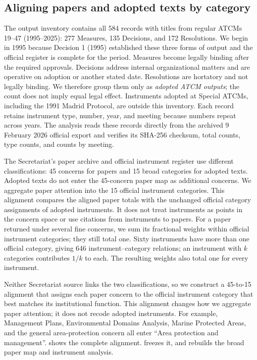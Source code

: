 \documentclass{fun_article}
\begin{document}
\subsection{Aligning papers and adopted texts by category}\label{sec:outcome-positioning}
The output inventory contains all 584 records with titles from regular ATCMs 19--47 (1995--2025): 277 Measures, 135 Decisions, and 172 Resolutions. We begin in 1995 because Decision 1 (1995) established these three forms of output and the official register is complete for the period. Measures become legally binding after the required approvals. Decisions address internal organizational matters and are operative on adoption or another stated date. Resolutions are hortatory and not legally binding. We therefore group them only as \emph{adopted ATCM outputs}; the count does not imply equal legal effect. Instruments adopted at Special ATCMs, including the 1991 Madrid Protocol, are outside this inventory. Each record retains instrument type, number, year, and meeting because numbers repeat across years. The analysis reads these records directly from the archived 9 February 2026 official export and verifies its SHA-256 checksum, total counts, type counts, and counts by meeting.

The Secretariat's paper archive and official instrument register use different classifications: 45 concerns for papers and 15 broad categories for adopted texts. Adopted texts do not enter the 45-concern paper map as additional concerns. We aggregate paper attention into the 15 official instrument categories. This alignment compares the aligned paper totals with the unchanged official category assignments of adopted instruments. It does not treat instruments as points in the concern space or use citations from instruments to papers. For a paper returned under several fine concerns, we sum its fractional weights within official instrument categories; they still total one. Sixty instruments have more than one official category, giving 646 instrument--category relations; an instrument with $k$ categories contributes $1/k$ to each. The resulting weights also total one for every instrument.

Neither Secretariat source links the two classifications, so we construct a 45-to-15 alignment that assigns each paper concern to the official instrument category that best matches its institutional function. This alignment changes how we aggregate paper attention; it does not recode adopted instruments. For example, Management Plans, Environmental Domains Analysis, Marine Protected Areas, and the general area-protection concern all enter ``Area protection and management''.  shows the complete alignment. \texttt{} freezes it, and \texttt{} rebuilds the broad paper map and instrument analysis.
\end{document}
